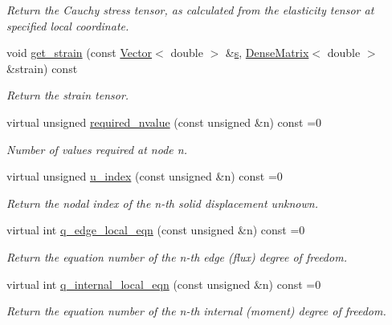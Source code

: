 \begin{DoxyCompactItemize}
\begin{DoxyCompactList}\small\item\em Return the Cauchy stress tensor, as calculated from the elasticity tensor at specified local coordinate. \end{DoxyCompactList}\item 
void \hyperlink{classoomph_1_1PoroelasticityEquations_aea601e7d1bc0757b9effa9dcdbfa0617}{get\+\_\+strain} (const \hyperlink{classoomph_1_1Vector}{Vector}$<$ double $>$ \&\hyperlink{cfortran_8h_ab7123126e4885ef647dd9c6e3807a21c}{s}, \hyperlink{classoomph_1_1DenseMatrix}{Dense\+Matrix}$<$ double $>$ \&strain) const
\begin{DoxyCompactList}\small\item\em Return the strain tensor. \end{DoxyCompactList}\item 
virtual unsigned \hyperlink{classoomph_1_1PoroelasticityEquations_ab22159684bdf5fdfe1591fb2afea1e95}{required\+\_\+nvalue} (const unsigned \&n) const =0
\begin{DoxyCompactList}\small\item\em Number of values required at node n. \end{DoxyCompactList}\item 
virtual unsigned \hyperlink{classoomph_1_1PoroelasticityEquations_a3fe57176b22729d251b13e0eb4e7d8fc}{u\+\_\+index} (const unsigned \&n) const =0
\begin{DoxyCompactList}\small\item\em Return the nodal index of the n-\/th solid displacement unknown. \end{DoxyCompactList}\item 
virtual int \hyperlink{classoomph_1_1PoroelasticityEquations_a0a707c501fd4ae67a423de848845b04c}{q\+\_\+edge\+\_\+local\+\_\+eqn} (const unsigned \&n) const =0
\begin{DoxyCompactList}\small\item\em Return the equation number of the n-\/th edge (flux) degree of freedom. \end{DoxyCompactList}\item 
virtual int \hyperlink{classoomph_1_1PoroelasticityEquations_a432e37d70b8fd6c643946609d5e92ddd}{q\+\_\+internal\+\_\+local\+\_\+eqn} (const unsigned \&n) const =0
\begin{DoxyCompactList}\small\item\em Return the equation number of the n-\/th internal (moment) degree of freedom. \end{DoxyCompactList}\item 

\end{DoxyCompactItemize}
